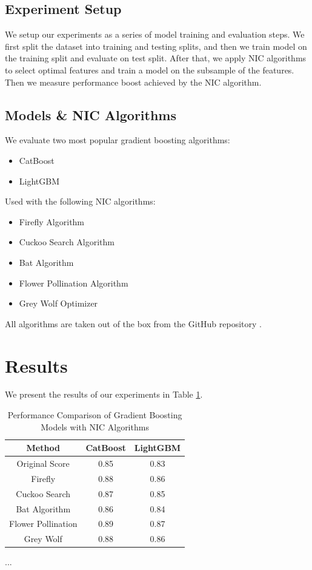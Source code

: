 \documentclass[conference]{IEEEtran}
\begin{document}
\subsection{Experiment Setup}
We setup our experiments as a series of model training and 
evaluation steps. We first split the dataset into training and testing
splits, and then we train model on the training split and evaluate on
test split. After that, we apply NIC algorithms to select optimal
features and train a model on the subsample of the features. Then
we measure performance boost achieved by the NIC algorithm.

\subsection{Models \& NIC Algorithms}
We evaluate two most popular gradient boosting algorithms:
\begin{itemize}
	\item CatBoost \cite{catboost}
	\item LightGBM \cite{lightgbm}
\end{itemize}
Used with the following NIC algorithms:
\begin{itemize}
	\item Firefly Algorithm
	\item Cuckoo Search Algorithm
	\item Bat Algorithm
	\item Flower Pollination Algorithm
	\item Grey Wolf Optimizer
\end{itemize}
All algorithms are taken out of the box from the GitHub repository
\cite{niapy}.

\section{Results}
We present the results of our experiments in Table \ref{tab:results}.

\begin{table}[H]
	\centering
	\caption{Performance Comparison of Gradient Boosting Models with NIC Algorithms}
	\label{tab:results}
	\begin{tabular}{c c c}
		\hline
		Method & CatBoost & LightGBM \\
		\hline
		Original Score & 0.85 & 0.83 \\
		Firefly & 0.88 & 0.86 \\
		Cuckoo Search & 0.87 & 0.85 \\
		Bat Algorithm & 0.86 & 0.84 \\
		Flower Pollination & 0.89 & 0.87 \\
		Grey Wolf & 0.88 & 0.86 \\
		\hline
	\end{tabular}
\end{table}
...
\end{document}
